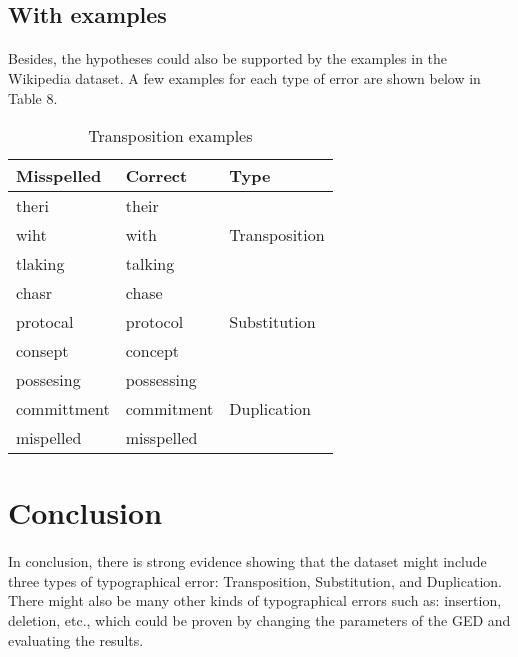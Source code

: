 \documentclass[11pt]{article}
\begin{document}
\subsection{With examples}

\paragraph{} Besides, the hypotheses could also be supported by the examples in the Wikipedia dataset. A few examples for each type of error are shown below in Table 8.

\begin{table}[!htbp]
\begin{center}
\begin{tabular}{| l | l | l |}
      \hline
      Misspelled & Correct & Type \\
      \hline\hline
      theri & their & \multirow{3}{*}{Transposition} \\
      wiht & with & \\
      tlaking & talking & \\
      \hline
      chasr & chase & \multirow{3}{*}{Substitution}\\
      protocal & protocol & \\
      consept & concept & \\
      \hline
      possesing & possessing & \multirow{3}{*}{Duplication} \\
      committment & commitment & \\
      mispelled & misspelled & \\
      \hline
\end{tabular}
\caption{Transposition examples}\label{table8}
\end{center}
\end{table}


\section{Conclusion}

\paragraph{} In conclusion, there is strong evidence showing that the dataset might include three types of typographical error: Transposition, Substitution, and Duplication. There might also be many other kinds of typographical errors such as: insertion, deletion, etc., which could be proven by changing the parameters of the GED and evaluating the results.

\printbibliography
\end{document}
